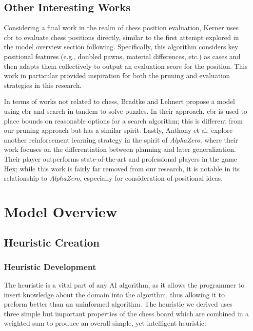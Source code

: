 \documentclass[letterpaper]{article}
\begin{document}
\subsection{Other Interesting Works}
Considering a final work in the realm of chess position evaluation, Kerner \cite{Kerner94} uses \acrshort{cbr} to evaluate chess positions directly, similar to the first attempt explored in the model overview section following.  Specifically, this algorithm considers key positional features (e.g., doubled pawns, material differences, etc.) as cases and then adapts them collectively to output an evaluation score for the position.  This work in particular provided inspiration for both the pruning and evaluation strategies in this research.

In terms of works not related to chess, Bradtke and Lehnert \cite{bradtke-lehnert88} propose a model using \acrshort{cbr} and search in tandem to solve puzzles.  In their approach, \acrshort{cbr} is used to place bounds on reasonable options for a search algorithm; this is different from our pruning approach but has a similar spirit.  Lastly, Anthony et al. \cite{anthony-et-al2017} explore another reinforcement learning strategy in the spirit of \textit{AlphaZero}, where their work focuses on the differentiation between planning and later generalization.  Their player outperforms state-of-the-art and professional players in the game Hex; while this work is fairly far removed from our research, it is notable in its relationship to \textit{AlphaZero}, especially for consideration of positional ideas.

\section{Model Overview}
\subsection{Heuristic Creation}
\subsubsection{Heuristic Development}The heuristic is a vital part of any AI algorithm, as it allows the programmer to insert knowledge about the domain into the algorithm, thus allowing it to preform better than an uninformed algorithm.
The heuristic we derived uses three simple but important properties of the chess board which are combined in a weighted sum to produce an overall simple, yet intelligent heuristic:
\end{document}
